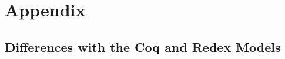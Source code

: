\section{Appendix}\label{app:main}

\subsection{Differences with the Coq and Redex Models}\label{app:model-diffs}


